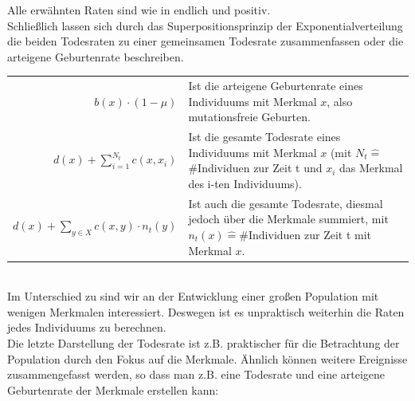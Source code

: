 \documentclass[11pt, a4paper, german]{article}
\theoremstyle{plain}
\begin{document}
	Alle erwähnten Raten sind wie in \cite{fournier2004microscopic} endlich und positiv. \\
	Schließlich lassen sich durch das Superpositionsprinzip der Exponentialverteilung die beiden Todesraten zu einer gemeinsamen Todesrate zusammenfassen oder die arteigene Geburtenrate beschreiben.\\
	
	\begin{tabular}{ r p{18em} }
		$ b(x) \cdot (1 - \mu) $ & Ist die arteigene Geburtenrate eines Individuums mit Merkmal $ x $, also mutationsfreie Geburten.\\
		$ d(x) + \sum_{i=1}^{N_t} c(x, x_i) $ & Ist die gesamte Todesrate eines Individuums mit Merkmal $ x $ (mit $ N_t \hat{=} $ \#Individuen zur Zeit t und $ x_i $ das Merkmal des i-ten Individuums).\\
		$ d(x) + \sum_{y \in X} c(x,y) \cdot n_t(y) $ & Ist auch die gesamte Todesrate, diesmal jedoch über die Merkmale summiert, mit $ n_t(x) \hat{=} \text{\#Individuen}$ zur Zeit t mit Merkmal $ x $.
	\end{tabular}\\
	
	Im Unterschied zu \cite{Champagnat20061127} sind wir an der Entwicklung einer großen Population mit wenigen Merkmalen interessiert. Deswegen ist es unpraktisch weiterhin die Raten jedes Individuums zu berechnen.\\
	Die letzte Darstellung der Todesrate ist z.B. praktischer für die Betrachtung der Population durch den Fokus auf die Merkmale. Ähnlich können weitere Ereignisse zusammengefasst werden, so dass man z.B. eine Todesrate und eine arteigene Geburtenrate der Merkmale erstellen kann:
	
\end{document}
